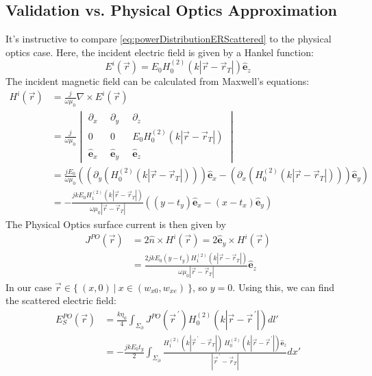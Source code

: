 \documentclass{article}
\begin{document}
\subsection{Validation vs. Physical Optics Approximation}
It's instructive to compare \eqref{eq:powerDistributionERScattered} to the physical
optics case. Here, the incident electric field is given by a Hankel function:
\begin{equation}
   E^i(\vec{r}) = E_0 H_0^{(2)}(k|\vec{r} - \vec{r}_T|) \hat{\mathbf{e}}_z
   \label{eq:incidentPOSetup1}
\end{equation}
The incident magnetic field can be calculated from Maxwell's equations:
\begin{align}
   H^i( \vec{r} ) &= \frac{j}{\omega \mu_0} \nabla \times E^i(\vec{r}) \nonumber \\
   &= \frac{j}{\omega \mu_0} 
      \begin{vmatrix} 
         \partial_x & \partial_y & \partial_z \\
         0 \quad & 0 \quad & E_0 H_0^{(2)}(k|\vec{r} - \vec{r}_T|) \\
         \hat{\mathbf{e}}_x & \hat{\mathbf{e}}_y & \hat{\mathbf{e}}_z
      \end{vmatrix}
      \nonumber \\
   &= \frac{j E_0}{\omega \mu_0 } \left( \left( \partial_y ( H_0^{(2)}(k|\vec{r} -
      \vec{r}_T|)) \right) \hat{\mathbf{e}}_x - \left( \partial_x (
      H_0^{(2)}(k|\vec{r} - \vec{r}_T|)) \right) \hat{\mathbf{e}}_y \right) \nonumber
      \\
   &= - \frac{jk E_0 H_1^{(2)} (k|\vec{r} - \vec{r}_T|) }{\omega \mu_0 |\vec{r} -
      \vec{r}_T|} \left( ( y - t_y ) \hat{\mathbf{e}}_x - ( x - t_x ) \hat{\mathbf{e}}_y\right)
\end{align}
The Physical Optics surface current is then given by 
\begin{align}
   J^{PO}(\vec{r}) &= 2 \hat{n} \times H^i( \vec{r} ) = 2 \hat{\mathbf{e}}_y \times
      H^i( \vec{r} ) \nonumber \\
   &= \frac{2jk E_0 (y-t_y) H_1^{(2)} (k|\vec{r} - \vec{r}_T|) }{\omega \mu_0
      |\vec{r} - \vec{r}_T|} \hat{\mathbf{e}}_z
\end{align}
In our case $\vec{r} \in \{ \ (x , 0) \ | \ x \in (w_{x0}, w_{xe}) \ \}$, so $y = 0$.
Using this, we can find the scattered electric field:
\begin{align}
   E_S^{PO}(\vec{r}) &= \frac{k \eta_0}{4} \int_{\Sigma_{\partial}} J^{PO}(\vec{r}^{\,\prime})
      H_0^{(2)}(k |\vec{r} - \vec{r}^{\,\prime}|) dl' \nonumber \\
   &= - \frac{j k E_0 t_y }{2} \int_{\Sigma_{\partial}}
      \frac{H_1^{(2)}(k | \vec{r}^{\,\prime} - \vec{r}_T |) \ H_0^{(2)}(k |\vec{r} -
      \vec{r}^{\,\prime}|)\hat{\mathbf{e}}_z }{|\vec{r}^{\,\prime} - \vec{r}_T|} dx'
   \end{align}
\end{document}
